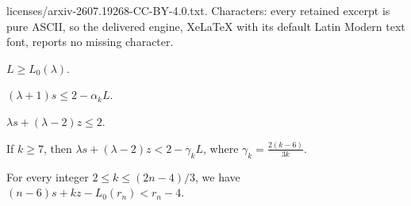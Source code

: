 \documentclass[10pt,a4paper]{amsart}
\begin{document}
licenses/arxiv-2607.19268-CC-BY-4.0.txt. Characters: every retained excerpt is pure ASCII, so the delivered engine, XeLaTeX with its default Latin Modern text font, reports no missing character.
\begin{lemma}\label{lem:L-L0}
$L\geq L_0(\lambda)$.
\end{lemma}

\begin{lemma}\label{lem:constraint}
$(\lambda + 1)s\leq 2 - \alpha_k L$.
\end{lemma}

\begin{lemma}\label{lem:topthree}
$\lambda s + (\lambda - 2) z\leq 2$.
\end{lemma}

\begin{lemma}\label{lem:weighted0}
If $k\geq 7$, then $\lambda s + (\lambda - 2) z < 2 - \gamma_k L$, where 
$\gamma_k = \frac{2(k - 6)}{3k}$.
\end{lemma}

\begin{lemma}\label{lem:normalized-first}
For every integer $2\leq k\le(2n-4)/3$, 
we have $(n-6)s + kz - L_0(r_n) < r_n - 4$.
\end{lemma}
\end{document}
